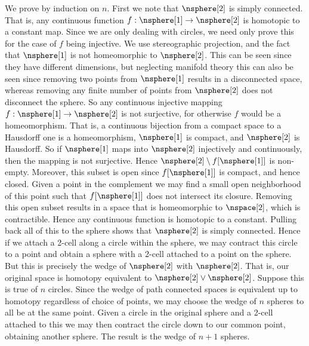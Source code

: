     \begin{solution}
        We prove by induction on $n$. First we note that $\nsphere[2]$ is
        simply connected. That is, any continuous function
        $f:\nsphere[1]\rightarrow\nsphere[2]$ is homotopic to a constant map.
        Since we are only dealing with circles, we need only prove this for the
        case of $f$ being injective. We use stereographic projection, and the
        fact that $\nsphere[1]$ is not homeomorphic to $\nsphere[2]$. This can
        be seen since they have different dimensions, but neglecting manifold
        theory this can also be seen since removing two points from
        $\nsphere[1]$ results in a disconnected space, whereas removing any
        finite number of points from
        $\nsphere[2]$ does not disconnect the sphere. So any continuous
        injective mapping $f:\nsphere[1]\rightarrow\nsphere[2]$ is not
        surjective, for otherwise $f$ would be a homeomorphism. That is, a
        continuous bijection from a compact space to a Hausdorff one is a
        homeomorphism, $\nsphere[1]$ is compact, and $\nsphere[2]$ is Hausdorff.
        So if $\nsphere[1]$ maps into $\nsphere[2]$ injectively and
        continuously, then the mapping is not surjective. Hence
        $\nsphere[2]\setminus{f}[\nsphere[1]]$ is non-empty. Moreover, this
        subset is open since $f[\nsphere[1]]$ is compact, and hence closed.
        Given a point in the complement we may find a small open neighborhood of
        this point such that $f[\nsphere[1]]$ does not intersect its closure.
        Removing this open subset results in a space that is homeomorphic to
        $\nspace[2]$, which is contractible. Hence any continuous function is
        homotopic to a constant. Pulling back all of this to the sphere shows
        that $\nsphere[2]$ is simply connected. Hence if we attach a 2-cell
        along a circle within the sphere, we may contract this circle to a point
        and obtain a sphere with a 2-cell attached to a point on the sphere.
        But this is precisely the wedge of $\nsphere[2]$ with $\nsphere[2]$.
        That is, our original space is homotopy equivalent to
        $\nsphere[2]\lor\nsphere[2]$. Suppose this is true of $n$ circles.
        Since the wedge of path connected spaces is equivalent up to homotopy
        regardless of choice of points, we may choose the wedge of $n$ spheres
        to all be at the same point. Given a circle in the original sphere and a
        2-cell attached to this we may then contract the circle down to our
        common point, obtaining another sphere. The result is the wedge of $n+1$
        spheres.
    \end{solution}
